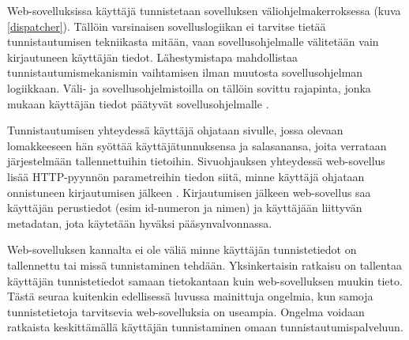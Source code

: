 Web-sovelluksissa käyttäjä tunnistetaan sovelluksen väliohjelmakerroksessa (kuva \ref{dispatcher}). Tällöin varsinaisen sovelluslogiikan ei tarvitse tietää tunnistautumisen tekniikasta mitään, vaan sovellusohjelmalle välitetään vain kirjautuneen käyttäjän tiedot. Lähestymistapa mahdollistaa tunnistautumismekanismin vaihtamisen ilman muutosta sovellusohjelman logiikkaan. Väli- ja sovellusohjelmistoilla on tällöin sovittu rajapinta, jonka mukaan käyttäjän tiedot päätyvät sovellusohjelmalle \cite{django}.

Tunnistautumisen yhteydessä käyttäjä ohjataan sivulle, jossa olevaan lomakkeeseen hän syöttää käyttäjätunnuksensa ja salasanansa, joita verrataan järjestelmään tallennettuihin tietoihin. Sivuohjauksen yhteydessä web-sovellus lisää HTTP-pyynnön parametreihin tiedon siitä, minne käyttäjä ohjataan onnistuneen kirjautumisen jälkeen \cite{oauth2_0}. Kirjautumisen jälkeen web-sovellus saa käyttäjän perustiedot (esim id-numeron ja nimen) ja käyttäjään liittyvän metadatan, jota käytetään hyväksi pääsynvalvonnassa.

Web-sovelluksen kannalta ei ole väliä minne käyttäjän tunnistetiedot on tallennettu tai missä tunnistaminen tehdään. Yksinkertaisin ratkaisu on tallentaa käyttäjän tunnistetiedot samaan tietokantaan kuin web-sovelluksen muukin tieto. Tästä seuraa kuitenkin edellisessä luvussa mainittuja ongelmia, kun samoja tunnistetietoja tarvitsevia web-sovelluksia on useampia. Ongelma voidaan ratkaista keskittämällä käyttäjän tunnistaminen omaan tunnistautumispalveluun.